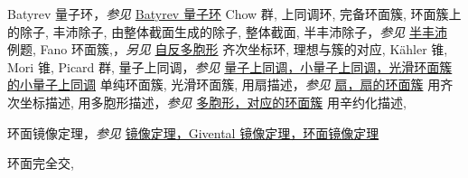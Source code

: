\begin{theindex}
\subitem \leavevmode\hypertarget{idx:1358}{Batyrev 量子环}，\textit{参见} \hyperlink{idx:0069}{Batyrev 量子环}
\subitem \leavevmode\hypertarget{idx:1359}{Chow 群},\enspace{}
\subitem \leavevmode\hypertarget{idx:1360}{上同调环},\enspace{}
\subitem \leavevmode\hypertarget{idx:1361}{完备环面簇},\enspace{}
\subitem \leavevmode\hypertarget{idx:1362}{环面簇上的除子},\enspace{}
\subsubitem \leavevmode\hypertarget{idx:1363}{丰沛除子},\enspace{}
\subsubitem \leavevmode\hypertarget{idx:1364}{由整体截面生成的除子},\enspace{}
\subsubitem \leavevmode\hypertarget{idx:1365}{整体截面},\enspace{}
\subsubitem \leavevmode\hypertarget{idx:1366}{半丰沛除子}，\textit{参见} \hyperlink{idx:1244}{半丰沛}
\subitem \leavevmode\hypertarget{idx:1367}{例题},\enspace{}
\subitem \leavevmode\hypertarget{idx:1368}{Fano 环面簇},\enspace{}，\textit{另见} \hyperlink{idx:1218}{自反多胞形}
\subitem \leavevmode\hypertarget{idx:1369}{齐次坐标环},\enspace{}
\subitem \leavevmode\hypertarget{idx:1370}{理想与簇的对应},\enspace{}
\subitem \leavevmode\hypertarget{idx:1371}{Kähler 锥},\enspace{}
\subitem \leavevmode\hypertarget{idx:1372}{Mori 锥},\enspace{}
\subitem \leavevmode\hypertarget{idx:1373}{Picard 群},\enspace{}
\subitem \leavevmode\hypertarget{idx:1374}{量子上同调}，\textit{参见} \hyperlink{idx:1141}{量子上同调，小量子上同调，光滑环面簇的小量子上同调}
\subitem \leavevmode\hypertarget{idx:1375}{单纯环面簇},\enspace{}
\subitem \leavevmode\hypertarget{idx:1376}{光滑环面簇},\enspace{}
\subitem \leavevmode\hypertarget{idx:1377}{用扇描述}，\textit{参见} \hyperlink{idx:0307}{扇，扇的环面簇}
\subitem \leavevmode\hypertarget{idx:1378}{用齐次坐标描述},\enspace{}
\subitem \leavevmode\hypertarget{idx:1379}{用多胞形描述}，\textit{参见} \hyperlink{idx:1082}{多胞形，对应的环面簇}
\subitem \leavevmode\hypertarget{idx:1380}{用辛约化描述},\enspace{}
\indexspace
\item \leavevmode\hypertarget{idx:1350}{环面镜像定理}，\textit{参见} \hyperlink{idx:0862}{镜像定理，Givental 镜像定理，环面镜像定理}
\indexspace
\item \leavevmode\hypertarget{idx:1347}{环面完全交},\enspace{}

\end{theindex}
